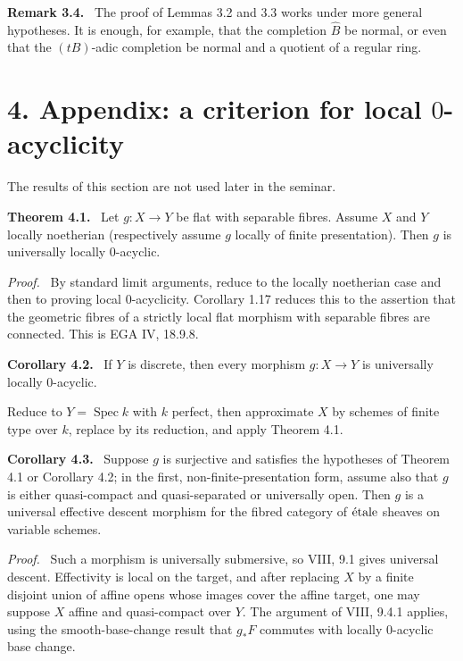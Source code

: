 \documentclass[12pt]{article}
\newcommand{\Spec}{\operatorname{Spec}}
\newcommand{\etale}{\ifmmode\textnormal{\'etale}\else\'etale\fi}
\newenvironment{statement}[1]{\par\medskip\noindent\textbf{#1.}\ }{\par\medskip}
\newenvironment{remarktext}[1]{\par\medskip\noindent\textbf{#1.}\ }{\par\medskip}
\newenvironment{prooftext}[1][Proof]{\par\noindent\emph{#1.}\ }{\par\medskip}
\begin{document}
\begin{remarktext}{Remark 3.4}
The proof of Lemmas 3.2 and 3.3 works under more general hypotheses. It is enough, for example, that the completion \(\widehat B\) be normal, or even that the \((tB)\)-adic completion be normal and a quotient of a regular ring.
\end{remarktext}

\section*{4. Appendix: a criterion for local \(0\)-acyclicity}

The results of this section are not used later in the seminar.

\begin{statement}{Theorem 4.1}
Let \(g:X\to Y\) be flat with separable fibres. Assume \(X\) and \(Y\) locally noetherian (respectively assume \(g\) locally of finite presentation). Then \(g\) is universally locally \(0\)-acyclic.
\end{statement}

\begin{prooftext}
By standard limit arguments, reduce to the locally noetherian case and then to proving local \(0\)-acyclicity. Corollary 1.17 reduces this to the assertion that the geometric fibres of a strictly local flat morphism with separable fibres are connected. This is EGA IV, 18.9.8.
\end{prooftext}

\begin{statement}{Corollary 4.2}
If \(Y\) is discrete, then every morphism \(g:X\to Y\) is universally locally \(0\)-acyclic.
\end{statement}

Reduce to \(Y=\Spec k\) with \(k\) perfect, then approximate \(X\) by schemes of finite type over \(k\), replace by its reduction, and apply Theorem 4.1.

\begin{statement}{Corollary 4.3}
Suppose \(g\) is surjective and satisfies the hypotheses of Theorem 4.1 or Corollary 4.2; in the first, non-finite-presentation form, assume also that \(g\) is either quasi-compact and quasi-separated or universally open. Then \(g\) is a universal effective descent morphism for the fibred category of \(\etale\) sheaves on variable schemes.
\end{statement}

\begin{prooftext}
Such a morphism is universally submersive, so VIII, 9.1 gives universal descent. Effectivity is local on the target, and after replacing \(X\) by a finite disjoint union of affine opens whose images cover the affine target, one may suppose \(X\) affine and quasi-compact over \(Y\). The argument of VIII, 9.4.1 applies, using the smooth-base-change result that \(g_*F\) commutes with locally \(0\)-acyclic base change.
\end{prooftext}
\end{document}
